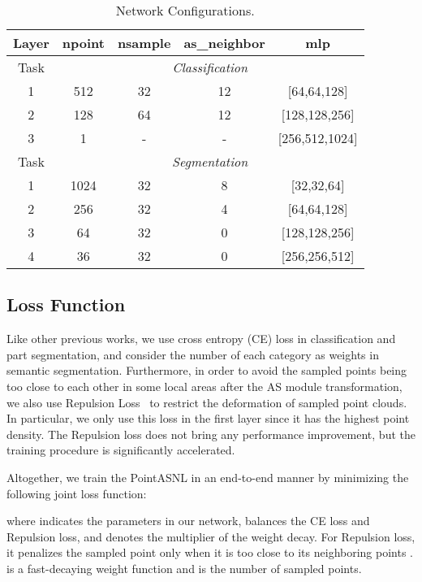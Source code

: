 \documentclass[10pt,twocolumn,letterpaper]{article}
\begin{document}
	\begin{table}[t]
		\small
		\renewcommand\tabcolsep{5.5pt} 
		\begin{center}
			\caption{Network Configurations.}
			\begin{tabular}{c|cccc}
				\hline
				Layer& npoint& nsample& as\_neighbor & mlp\\
				\hline
				\hline 
				Task		&	\multicolumn{4}{c}{\textit {Classification}}\\\hline
				1& 512&32&12&[64,64,128] \\	
				2& 128&64&12&[128,128,256]  \\
				3& 1&-&-&[256,512,1024]  \\\hline
				Task		&	\multicolumn{4}{c}{\textit {Segmentation}}\\\hline
				1& 1024&32&8&[32,32,64] \\	
				2& 256&32&4&[64,64,128]  \\
				
				3& 64&32&0& [128,128,256] \\	
				4& 36&32&0& [256,256,512] \\	
				\hline
				
			\end{tabular}
			\label{config}
		\end{center}
	\vspace{-0.3cm}
	\end{table}	
	\subsection{Loss Function}
	Like other previous works, we use cross entropy (CE) loss in classification and part segmentation, and consider the number of each category as weights in semantic segmentation. Furthermore, in order to avoid the sampled points being too close to each other in some local areas after the AS module transformation, we also use {{Repulsion Loss}}~\cite{PUNet} to restrict the deformation of sampled point clouds. In particular, we only use this loss in the first layer since it has the highest point density. The Repulsion loss does not bring any performance improvement, but the training procedure is significantly accelerated.
	
	Altogether, we train the PointASNL in an end-to-end manner by minimizing the following joint loss function:
	
	where  indicates the parameters in our network,  balances the CE loss and Repulsion loss, and  denotes the multiplier of the weight decay. For Repulsion loss, it penalizes the sampled point  only when it is too close to its neighboring points .  is a fast-decaying weight function and  is the number of sampled points.
	
\end{document}
